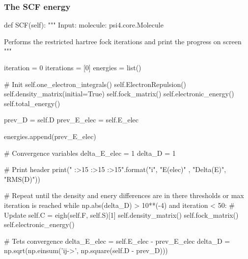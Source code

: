 \documentclass{beamer}
\begin{document}
\begin{frame}[fragile]
    \frametitle{The SCF energy}
    \begin{python}

        def SCF(self):
        """
        Input:
            molecule: psi4.core.Molecule
            
        Performs the restricted hartree fock iterations and print the progress on screen
        """
        
        iteration = 0
        iterations = [0]
        energies = list()
    \end{python}
\end{frame}
\begin{frame}[fragile]
    \begin{python}
   
        # Init
        self.one_electron_integrals()
        self.ElectronRepulsion()
        self.density_matrix(initial=True)
        self.fock_matrix()
        self.electronic_energy()
        self.total_energy()

        prev_D = self.D
        prev_E_elec = self.E_elec
        
        energies.append(prev_E_elec)
    \end{python}
\end{frame}
\begin{frame}[fragile]
    \begin{python}
        # Convergence variables
        delta_E_elec = 1
        delta_D = 1
        
        # Print header
        print("{} {:>15} {:>15} {:>15}".format("i", "E(elec)" , "Delta(E)", "RMS(D)"))
    \end{python}
\end{frame}
\begin{frame}[fragile]
    \begin{python} 
        # Repeat until the density and enery differences are in there thresholds or max iteration is reached
        while np.abs(delta_D) > 10**(-4) and iteration < 50:
            # Update
            self.C = eigh(self.F, self.S)[1]
            self.density_matrix()
            self.fock_matrix()
            self.electronic_energy()
        \end{python}
    \end{frame}
    \begin{frame}[fragile]
        \begin{python}
             # Tets convergence
            delta_E_elec = self.E_elec - prev_E_elec
            delta_D = np.sqrt(np.einsum('ij->', np.square(self.D - prev_D)))
        \end{python}
    \end{frame}
\end{document}
